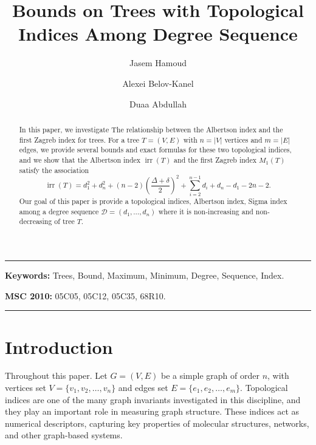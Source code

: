 \documentclass[12pt]{amsart}
\author{Jasem Hamoud}
\author{Alexei Belov-Kanel}
\author{Duaa Abdullah}
\title{Bounds on Trees with Topological Indices Among Degree Sequence}
\date{}
\newcommand{\irr}{\operatorname{irr}}
\begin{document}

\begin{abstract}
In this paper, we investigate The relationship between the Albertson index and the first Zagreb index for trees.  For a tree $T=(V,E)$ with $n=|V|$ vertices and $m=|E|$ edges, we provide several bounds and exact formulas for these two topological indices, and we show that the Albertson index $\irr(T)$ and the first Zagreb index $M_1(T)$ satisfy the association \[ \irr(T)=d_1^2+d_n^2+(n-2)\left(\frac{\Delta + \delta}{2}\right)^2+\sum_{i=2}^{n-1} d_i+d_n - d_1-2n-2.\]
Our goal of this paper is provide a topological indices, Albertson index, Sigma index among a degree sequence $\mathscr{D}=(d_1,\dots,d_n)$  where it is non-increasing and non-decreasing of tree $T$.
\end{abstract}

\maketitle


\noindent\rule{12.7cm}{1.0pt}

\noindent
\textbf{Keywords:} Trees, Bound, Maximum, Minimum, Degree, Sequence, Index.


\medskip

\noindent

\medskip

\noindent
{\bf MSC 2010:} 05C05, 05C12, 05C35, 68R10.




\noindent\rule{12.7cm}{1.0pt}

\section{Introduction}\label{sec1}
Throughout this paper. Let $G=(V,E)$ be a simple graph of order $n$, with vertices set $V=\{v_1,v_2,\dots,v_n\}$ and edges set $E=\{e_1,e_2,\dots,e_m\}$.  Topological indices are one of the many graph invariants investigated in this discipline, and they play an important role in measuring graph structure.  These indices act as numerical descriptors, capturing key properties of molecular structures, networks, and other graph-based systems.
\end{document}
